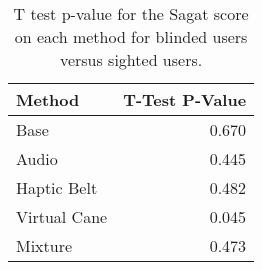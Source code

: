 
\begin{table}[!htb]
\centering
\caption{T test p-value for the Sagat score on each method for blinded users versus sighted users.}
\label{tab:ttest_sagat_score}
\begin{tabular}{lr}
\toprule
      Method &  T-Test P-Value \\
\midrule
        Base &           0.670 \\
       Audio &           0.445 \\
 Haptic Belt &           0.482 \\
Virtual Cane &           0.045 \\
     Mixture &           0.473 \\
\bottomrule
\end{tabular}
\end{table}

